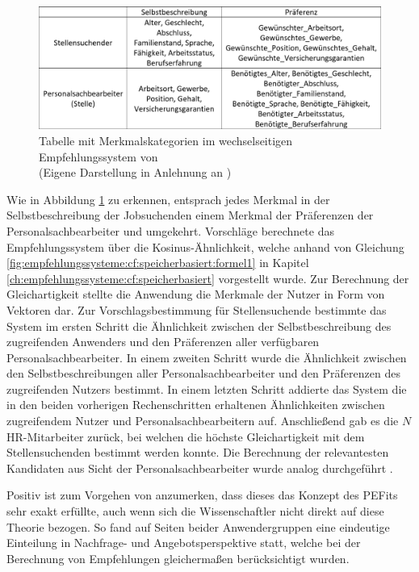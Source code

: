 \begin{figure}[h]
	\centering
	\includegraphics[width=1\textwidth]{gfx/hong-tabelle.png}
	\caption{Tabelle mit Merkmalskategorien im wechselseitigen Empfehlungssystem von \textcite[S. 2]{wenxing:2015}\\
	(Eigene Darstellung in Anlehnung an \cite[S. 2]{wenxing:2015})}
	\label{fig:verwandteArbeiten:nichtAufDemPEFitBasierendeBilateraleSysteme:abb1}
\end{figure}

Wie in Abbildung \ref{fig:verwandteArbeiten:nichtAufDemPEFitBasierendeBilateraleSysteme:abb1} zu erkennen, entsprach jedes Merkmal in der Selbstbeschreibung der Jobsuchenden einem Merkmal der Präferenzen der Personalsachbearbeiter und umgekehrt. Vorschläge berechnete das Empfehlungssystem über die Kosinus-Ähnlichkeit, welche anhand von Gleichung \ref{fig:empfehlungssysteme:cf:speicherbasiert:formel1} in Kapitel \ref{ch:empfehlungssysteme:cf:speicherbasiert} vorgestellt wurde. Zur Berechnung der Gleichartigkeit stellte die Anwendung die Merkmale der Nutzer in Form von Vektoren dar. Zur Vorschlagsbestimmung für Stellensuchende bestimmte das System im ersten Schritt die Ähnlichkeit zwischen der Selbstbeschreibung des zugreifenden Anwenders und den Präferenzen aller verfügbaren Personalsachbearbeiter. In einem zweiten Schritt wurde die Ähnlichkeit zwischen den Selbstbeschreibungen aller Personalsachbearbeiter und den Präferenzen des zugreifenden Nutzers bestimmt. In einem letzten Schritt addierte das System die in den beiden vorherigen Rechenschritten erhaltenen Ähnlichkeiten zwischen zugreifendem Nutzer und Personalsachbearbeitern auf. Anschließend gab es die $N$ HR-Mitarbeiter zurück, bei welchen die höchste Gleichartigkeit mit dem Stellensuchenden bestimmt werden konnte. Die Berechnung der relevantesten Kandidaten aus Sicht der Personalsachbearbeiter wurde analog durchgeführt \cite[S. 2f.]{wenxing:2015}.

Positiv ist zum Vorgehen von \textcite[S. 1ff.]{wenxing:2015} anzumerken, dass dieses das Konzept des \acp{PEFit} sehr exakt erfüllte, auch wenn sich die Wissenschaftler nicht direkt auf diese Theorie bezogen. So fand auf Seiten beider Anwendergruppen eine eindeutige Einteilung in Nachfrage- und Angebotsperspektive statt, welche bei der Berechnung von Empfehlungen gleichermaßen berücksichtigt wurden.

